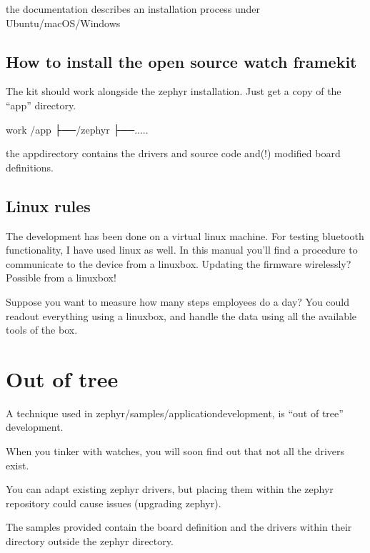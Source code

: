 \documentclass[letterpaper,10pt,english]{sphinxmanual}
\begin{document}
the documentation describes an installation process under Ubuntu/macOS/Windows


\section{How to install the open source watch framekit}
\label{\detokenize{installation:how-to-install-the-open-source-watch-framekit}}
The kit should work alongside the zephyr installation.
Just get a copy of the “app” directory.

\begin{sphinxVerbatim}[commandchars=\\\{\}]
\PYGZlt{}work\PYGZgt{}  /app
     ├──/zephyr
     ├──.....
\end{sphinxVerbatim}

the app\sphinxhyphen{}directory contains the drivers and source code and(!) modified board definitions.


\section{Linux rules}
\label{\detokenize{installation:linux-rules}}
The development has been done on a virtual linux machine.
For testing bluetooth functionality, I have used linux as well.
In this manual you’ll find a procedure to communicate to the device from a linuxbox.
Updating the firmware wirelessly? Possible from a linuxbox!

Suppose you want to measure how many steps employees do a day?
You could readout everything using a linuxbox, and handle the data using all the available tools of the box.



\chapter{Out of tree}
\label{\detokenize{out-of-tree:out-of-tree}}\label{\detokenize{out-of-tree::doc}}
A technique used in zephyr/samples/application\sphinxhyphen{}development, is “out of tree” development.

When you tinker with watches, you will soon find out that not all the drivers exist.

You can adapt existing zephyr drivers, but placing them within the zephyr repository could cause issues (upgrading zephyr).

The samples provided contain the board definition and the drivers within their directory outside the zephyr directory.
\end{document}

